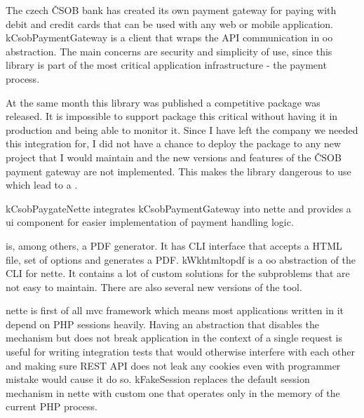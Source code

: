  \label{sec:state:csob-payment-gateway}

The czech ČSOB bank has created its own payment gateway for paying with debit and credit cards that can be used with any web or mobile application. \gls{kCsobPaymentGateway} is a client that wraps the API communication in \gls{oo} abstraction. The main concerns are security and simplicity of use, since this library is part of the most critical application infrastructure - the payment process.

At the same month this library was published a competitive package  was released. It is impossible to support package this critical without having it in production and being able to monitor it. Since I have left the company we needed this integration for, I did not have a chance to deploy the package to any new project that I would maintain and the new versions and features of the ČSOB payment gateway are not implemented. This makes the library dangerous to use which lead to a .

 \label{sec:state:csob-paygate-nette}

\gls{kCsobPaygateNette} integrates \gls{kCsobPaymentGateway} into \gls{nette} and provides a \gls{ui} component for easier implementation of payment handling logic.

 \label{sec:state:wkhtmltopdf}

 is, among others, a PDF generator. It has CLI interface that accepts a HTML file, set of options and generates a PDF. \gls{kWkhtmltopdf} is a \gls{oo} abstraction of the CLI for \gls{nette}. It contains a lot of custom solutions for the subproblems that are not easy to maintain. There are also several new versions of the tool.

 \label{sec:state:fake-session}

\gls{nette} is first of all \gls{mvc} framework which means most applications written in it depend on PHP sessions heavily. Having an abstraction that disables the mechanism but does not break application in the context of a single request is useful for writing integration tests that would otherwise interfere with each other and making sure REST API does not leak any cookies even with programmer mistake would cause it do so. \gls{kFakeSession} replaces the default session mechanism in \gls{nette} with custom one that operates only in the memory of the current PHP process.

